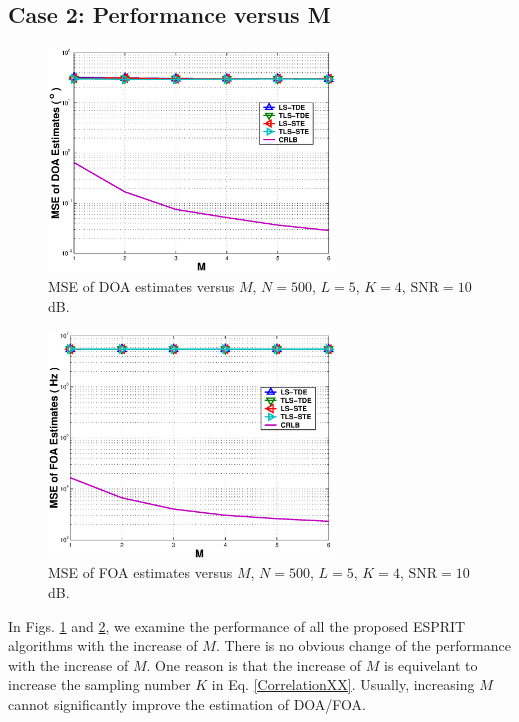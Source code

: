 \documentclass[conference]{IEEEtran}
\begin{document}
\subsection*{Case 2: Performance versus M}
\begin{figure}
\begin{center}
\includegraphics[width=3in]{SF_DOAM.eps}
\caption{MSE of DOA estimates versus $M$, $N=500$, $L=5$, $K=4$,
$\mbox{SNR}=10$dB.} \label{SFDOAM}
\end{center}
\end{figure}
\begin{figure}
\begin{center}
\includegraphics[width=3in]{SF_FOAM.eps}
\caption{MSE of FOA estimates versus $M$, $N=500$, $L=5$, $K=4$,
$\mbox{SNR}=10$dB.} \label{SFFOAM}
\end{center}
\end{figure}
In Figs. \ref{SFDOAM} and \ref{SFFOAM}, we examine the performance
of all the proposed ESPRIT algorithms with the increase of $M$.
There is no obvious change of the performance with the increase of
$M$. One reason is that the increase of $M$ is equivelant to
increase the sampling number $K$ in Eq. \ref{CorrelationXX}.
Usually, increasing $M$ cannot significantly improve the
estimation of DOA/FOA.
\end{document}
